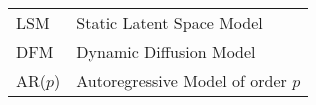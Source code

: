 \begin{tabular}{|l|l|}
    \hline
    LSM & Static Latent Space Model \\
    DFM & Dynamic Diffusion Model \\
    AR($p$) & Autoregressive Model of order $p$ \\
    \hline
\end{tabular}